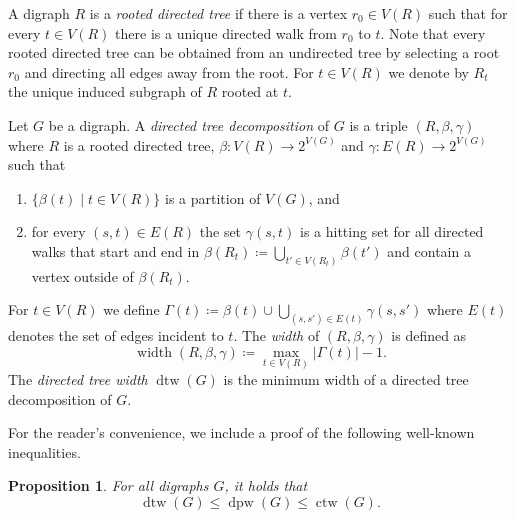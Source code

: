 \PassOptionsToPackage{dvipsnames,svgnames}{xcolor}\documentclass[10pt,a4paper]{article}
\newtheorem{proposition}{Proposition}[section]
\DeclareMathOperator{\width}{width}
\DeclareMathOperator{\dtw}{dtw}
\DeclareMathOperator{\dpw}{dpw}
\DeclareMathOperator{\ctw}{ctw}
\begin{document}
A digraph $R$ is a \emph{rooted directed tree} if there is a vertex $r_0 \in V(R)$ such that for every $t \in V(R)$ there is a unique directed walk from $r_0$ to $t$.
Note that every rooted directed tree can be obtained from an undirected tree by selecting a root $r_0$ and directing all edges away from the root.
For $t \in V(R)$ we denote by $R_t$ the unique induced subgraph of $R$ rooted at $t$.

Let $G$ be a digraph.
A \emph{directed tree decomposition} of $G$ is a triple $(R,\beta,\gamma)$ where $R$ is a rooted directed tree, $\beta\colon V(R) \to 2^{V(G)}$ and $\gamma\colon E(R) \to 2^{V(G)}$ such that
\begin{enumerate}[label = (D.\arabic*),leftmargin=*]
 \item\label{item:directed-tree-decomposition-1} $\{\beta(t) \mid t \in V(R)\}$ is a partition of $V(G)$, and
 \item\label{item:directed-tree-decomposition-2} for every $(s,t) \in E(R)$ the set $\gamma(s,t)$ is a hitting set for all directed walks that start and end in $\beta(R_t) \coloneqq \bigcup_{t' \in V(R_t)}\beta(t')$ and contain a vertex outside of $\beta(R_t)$.
\end{enumerate}
For $t \in V(R)$ we define $\Gamma(t) \coloneqq \beta(t) \cup \bigcup_{(s,s') \in E(t)} \gamma(s,s')$ where $E(t)$ denotes the set of edges incident to $t$.
The \emph{width} of $(R,\beta,\gamma)$ is defined as
\[\width(R,\beta,\gamma) \coloneqq \max_{t \in V(R)} |\Gamma(t)| - 1.\]
The \emph{directed tree width} $\dtw(G)$ is the minimum width of a directed tree decomposition of $G$.

For the reader's convenience, we include a proof of the following well-known inequalities.

\begin{proposition}
 For all digraphs $G$, it holds that
 \[\dtw(G) \leq \dpw(G) \leq \ctw(G).\]
\end{proposition}
\end{document}
